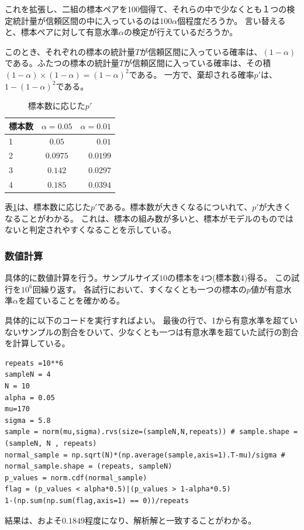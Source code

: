 これを拡張し、二組の標本ペアを100個得て、それらの中で少なくとも１つの検定統計量が信頼区間の中に入っているのは$100\alpha$個程度だろうか。
言い替えると、標本ペアに対して有意水準$\alpha$の検定が行えているだろうか。


このとき、それぞれの標本の統計量$T$が信頼区間に入っている確率は、$(1-\alpha)$である。ふたつの標本の統計量$T$が信頼区間に入っている確率は、その積$(1-\alpha)\times(1-\alpha)=(1-\alpha)^2$である。
一方で、棄却される確率$p'$は、$1-(1-\alpha)^2$である。

\begin{table}[hbtp]
    \caption{標本数に応じた$p'$}
    \label{table:multiple_test_reject_prob}
    \centering
    \begin{tabular}{lcr}
      \hline
      標本数  & $\alpha=0.05$  &  $\alpha=0.01$ \\
      \hline \hline
       1 & $0.05$  & $0.01$ \\
       2 & $0.0975$ & $0.0199$\\
       3 & $0.142$ & $0.0297$\\
       4 & $0.185$ & $0.0394$\\
    \end{tabular}
  \end{table}
表\ref{table:multiple_test_reject_prob}は、標本数に応じた$p'$である。標本数が大きくなるについれて、$p'$が大きくなることがわかる。
これは、標本の組み数が多いと、標本がモデルのものではないと判定されやすくなることを示している。


\subsubsection{数値計算}
具体的に数値計算を行う。サンプルサイズ$10$の標本を$4$つ(標本数$4$)得る。
この試行を$10^6$回繰り返す。
各試行において、すくなくとも一つの標本の$p$値が有意水準$\alpha$を超ていることを確かめる。

具体的に以下のコードを実行すればよい。
最後の行で、1から有意水準を超ていないサンプルの割合をひいて、少なくとも一つは有意水準を超ていた試行の割合を計算している。
\begin{lstlisting}
repeats =10**6
sampleN = 4
N = 10
alpha = 0.05
mu=170
sigma = 5.8
sample = norm(mu,sigma).rvs(size=(sampleN,N,repeats)) # sample.shape = (sampleN, N , repeats)
normal_sample = np.sqrt(N)*(np.average(sample,axis=1).T-mu)/sigma # normal_sample.shape = (repeats, sampleN)
p_values = norm.cdf(normal_sample)
flag = (p_values < alpha*0.5)|(p_values > 1-alpha*0.5)
1-(np.sum(np.sum(flag,axis=1) == 0))/repeats
\end{lstlisting}
結果は、およそ$0.1849$程度になり、解析解と一致することがわかる。

